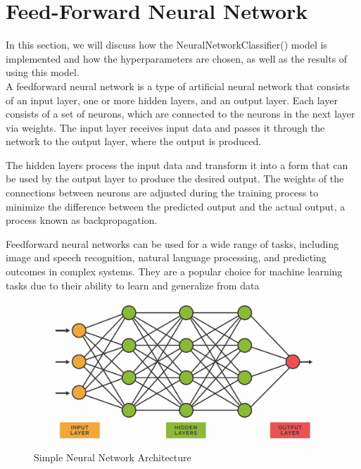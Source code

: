 \section{Feed-Forward Neural Network}
In this section, we will discuss how the NeuralNetworkClassifier() model is implemented and how the hyperparameters are chosen, as well as the results of using this model.\\

A feedforward neural network is a type of artificial neural network that consists of an input layer, one or more hidden layers, and an output layer.
Each layer consists of a set of neurons, which are connected to the neurons in the next layer via weights.
The input layer receives input data and passes it through the network to the output layer, where the output is produced.

The hidden layers process the input data and transform it into a form that can be used by the output layer to produce the desired output.
The weights of the connections between neurons are adjusted during the training process to minimize the difference between the predicted output and the actual output, a process known as backpropagation.

Feedforward neural networks can be used for a wide range of tasks, including image and speech recognition, natural language processing, and predicting outcomes in complex systems.
They are a popular choice for machine learning tasks due to their ability to learn and generalize from data\\

\begin{figure}[ht]
    \centering
    \includegraphics[scale=0.3]{figures_for_report/simple_neural_network}
    \captionsetup{justification=centering,margin=2cm}
    \caption{Simple Neural Network Architecture}
\end{figure}


